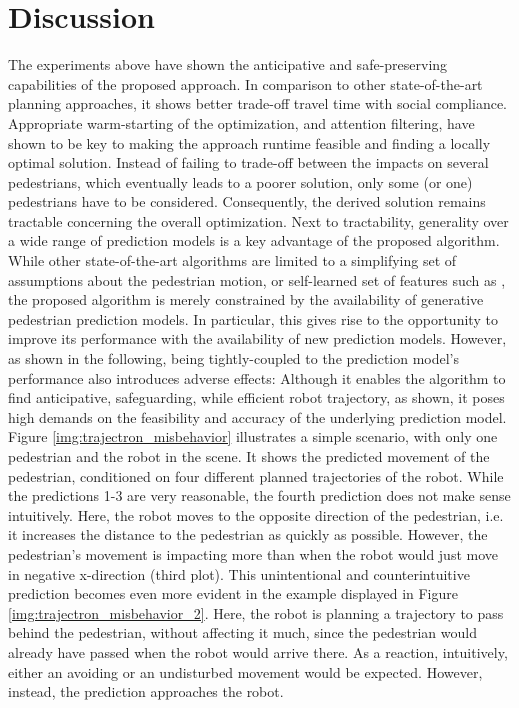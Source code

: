 \section{Discussion}
\label{text:experiments/discussion}
The experiments above have shown the anticipative and safe-preserving capabilities of the proposed approach. In comparison to other state-of-the-art planning approaches, it shows better trade-off travel time with social compliance. Appropriate warm-starting of the optimization, and attention filtering, have shown to be key to making the approach runtime feasible and finding a locally optimal solution. Instead of failing to trade-off between the impacts on several pedestrians, which eventually leads to a poorer solution, only some (or one) pedestrians have to be considered. Consequently, the derived solution remains tractable concerning the overall optimization. Next to tractability, generality over a wide range of prediction models is a key advantage of the proposed algorithm. While other state-of-the-art algorithms are limited to a simplifying set of assumptions about the pedestrian motion, or self-learned set of features such as \cite{Chen2017}\cite{vandenBerg2011}\cite{Ferrer2013}\cite{Kim2016}, the proposed algorithm is merely constrained by the availability of generative pedestrian prediction models. In particular, this gives rise to the opportunity to improve its performance with the availability of new prediction models. However, as shown in the following, being tightly-coupled to the prediction model's performance also introduces adverse effects:
\newline
Although it enables the algorithm to find anticipative, safeguarding, while efficient robot trajectory, as shown, it poses high demands on the feasibility and accuracy of the underlying prediction model. Figure \ref{img:trajectron_misbehavior} illustrates a simple scenario, with only one pedestrian and the robot in the scene. It shows the predicted movement of the pedestrian, conditioned on four different planned trajectories of the robot. While the predictions 1-3 are very reasonable, the fourth prediction does not make sense intuitively. Here, the robot moves to the opposite direction of the pedestrian, i.e.\, it increases the distance to the pedestrian as quickly as possible. However, the pedestrian's movement is impacting more than when the robot would just move in negative x-direction (third plot). This unintentional and counterintuitive prediction becomes even more evident in the example displayed in Figure \ref{img:trajectron_misbehavior_2}. Here, the robot is planning a trajectory to pass behind the pedestrian, without affecting it much, since the pedestrian would already have passed when the robot would arrive there. As a reaction, intuitively, either an avoiding or an undisturbed movement would be expected. However, instead, the prediction approaches the robot. 

